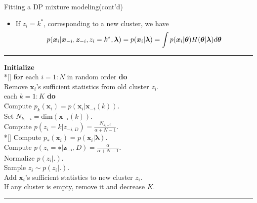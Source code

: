 \documentclass[10pt,mathserif]{beamer}
\begin{document}
\begin{frame}{Fitting a DP mixture modeling(cont'd)}
\begin{itemize}
    \item If $z_i = k^*$, corresponding to a new cluster, we have
    \begin{equation*}\small
        p(\bm{x}_i|\bm{x}_{-i}, \bm{z}_{-i}, z_i = k^*,\bm{\lambda}) = p(\bm{x}_i|\bm{\lambda}) = \int p(\bm{x}_i|\bm{\theta})H(\bm{\theta}|\bm{\lambda})d\bm{\theta}
    \end{equation*}
\end{itemize}    

\noindent\rule[-5pt]{\textwidth}{0.4pt}
{\footnotesize
\begin{tabbing}
    {\bf Initialize} \\*[\smallskipamount]
    {\bf for} each $i=1:N$ in random order {\bf do}\\
    \= Remove $\bm{x}_i$'s sufficient statistics from old cluster $z_i$. \\
         each $k=1:K$ {\bf do}\\
        \qquad \= Compute $p_k(\bm{x}_i) = p(\bm{x}_i|\bm{x}_{-i}(k))$.\\
        \> Set $N_{k,-i} = \text{dim}(\bm{x}_{-i}(k))$.\\
        \> Compute $p(z_i = k|z_{-i, D}) = \frac{N_{k,-i}}{\alpha+N-1}$. \\*[\smallskipamount]
    \= Compute $p_*(\bm{x}_i) = p(\bm{x}_i|\bm{\lambda})$. \\
    \> Compute $p(z_i = ∗|\bm{z}_{-i}, D) = \frac{\alpha}{\alpha+N-1}$.\\
    \> Normalize $p(z_i |.)$.\\
    \> Sample $z_i \sim p(z_i |.)$.\\
    \> Add $\bm{x}_i$'s sufficient statistics to new cluster $z_i$.\\
    \> If any cluster is empty, remove it and decrease $K$.
\end{tabbing}}
\noindent\rule[10pt]{\textwidth}{0.4pt}
\end{frame}
\end{document}

